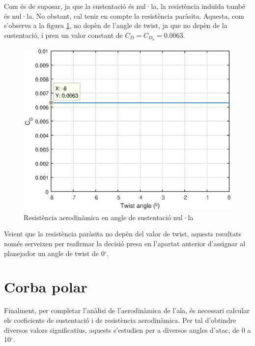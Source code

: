 Com és de suposar, ja que la sustentació és nul·la, la resistència induïda també és nul·la. No obstant, cal tenir en compte la resistència paràsita. Aquesta, com s'observa a la figura \ref{cdpar}, no depèn de l'angle de twist, ja que no depèn de la sustentació, i pren un valor constant de $C_{D}=C_{D_{0}}=0.0063$.

\begin{figure}[h]
	\centering
	\includegraphics{./plots/cdparasita}
	\caption{Resistència aerodinàmica en angle de sustentació nul·la}
	\label{cdpar}
\end{figure}

Veient que la resistència paràsita no depèn del valor de twist, aquests resultats només serveixen per reafirmar la decisió presa en l'apartat anterior d'assignar al planejador un angle de twist de 0$^{\circ}$.

\section{Corba polar}
Finalment, per completar l'anàlisi de l'aerodinàmica de l'ala, és necessari calcular els coeficients de sustentació i de resistència aerodinàmica. Per tal d'obtindre diversos valors significatius, aquests s'estudien per a diversos angles d'atac, de 0 a 10$^{\circ}$.

